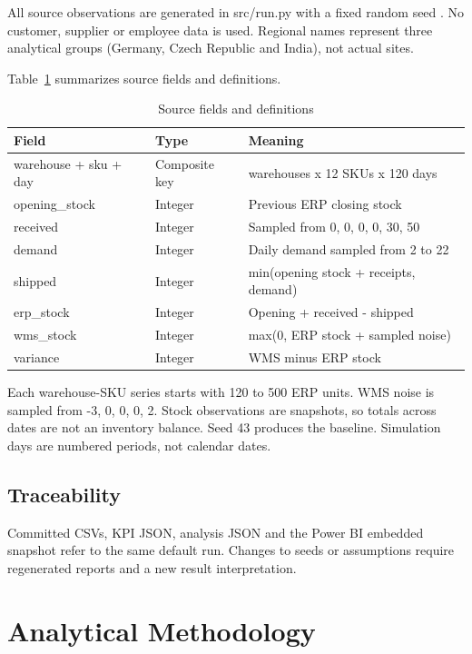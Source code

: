 \documentclass[conference,letterpaper]{IEEEtran}
\begin{document}
All source observations are generated in src/run.py with a fixed random seed \cite{r1}. No customer, supplier or employee data is used. Regional names represent three analytical groups (Germany, Czech Republic and India), not actual sites.


Table~\ref{tab:2} summarizes source fields and definitions.

\begin{table}[H]
\caption{Source fields and definitions}\label{tab:2}
\centering\footnotesize
\setlength{\tabcolsep}{3pt}
\begin{tabularx}{\columnwidth}{>{\raggedright\arraybackslash}X >{\raggedright\arraybackslash}X >{\raggedright\arraybackslash}X}
\hline
\textbf{Field} & \textbf{Type} & \textbf{Meaning} \\
\hline
warehouse + sku + day & Composite key & 3 warehouses x 12 SKUs x 120 days \\
opening\_stock & Integer & Previous ERP closing stock \\
received & Integer & Sampled from 0, 0, 0, 0, 30, 50 \\
demand & Integer & Daily demand sampled from 2 to 22 \\
shipped & Integer & min(opening stock + receipts, demand) \\
erp\_stock & Integer & Opening + received - shipped \\
wms\_stock & Integer & max(0, ERP stock + sampled noise) \\
variance & Integer & WMS minus ERP stock \\
\hline
\end{tabularx}
\end{table}

Each warehouse-SKU series starts with 120 to 500 ERP units. WMS noise is sampled from -3, 0, 0, 0, 2. Stock observations are snapshots, so totals across dates are not an inventory balance. Seed 43 produces the baseline. Simulation days are numbered periods, not calendar dates.


\subsection{Traceability}

Committed CSVs, KPI JSON, analysis JSON and the Power BI embedded snapshot refer to the same default run. Changes to seeds or assumptions require regenerated reports and a new result interpretation.


\section{Analytical Methodology}
\end{document}
